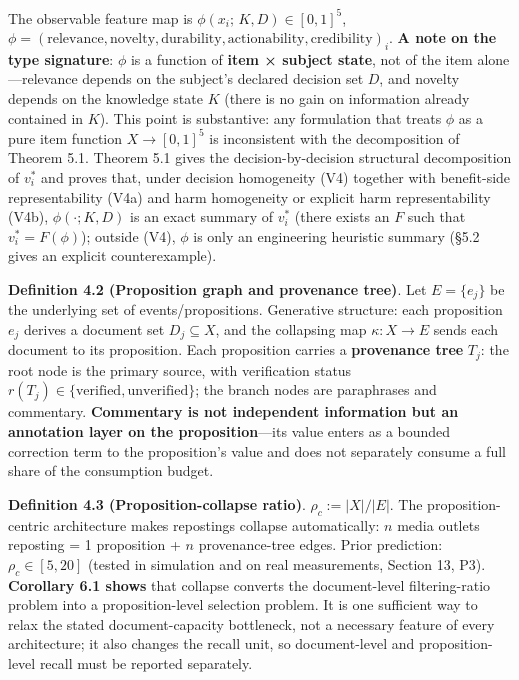 \documentclass[
  11pt]{article}
\begin{document}
The observable feature map is \(\phi(x_i;\, K, D) \in [0,1]^5\),
\(\phi = (\text{relevance}, \text{novelty}, \text{durability}, \text{actionability}, \text{credibility})_i\).
\textbf{A note on the type signature}: \(\phi\) is a function of
\textbf{item × subject state}, not of the item alone---relevance depends
on the subject's declared decision set \(D\), and novelty depends on the
knowledge state \(K\) (there is no gain on information already contained
in \(K\)). This point is substantive: any formulation that treats
\(\phi\) as a pure item function \(X \to [0,1]^5\) is inconsistent with
the decomposition of Theorem 5.1. Theorem 5.1 gives the
decision-by-decision structural decomposition of \(v_i^*\) and proves
that, under decision homogeneity (V4) together with benefit-side
representability (V4a) and harm homogeneity or explicit harm
representability (V4b), \(\phi(\cdot; K, D)\) is an exact summary of
\(v_i^*\) (there exists an \(F\) such that \(v_i^* = F(\phi)\)); outside
(V4), \(\phi\) is only an engineering heuristic summary (§5.2 gives an
explicit counterexample).

\textbf{Definition 4.2 (Proposition graph and provenance tree)}. Let
\(E = \{e_j\}\) be the underlying set of events/propositions. Generative
structure: each proposition \(e_j\) derives a document set
\(D_j \subseteq X\), and the collapsing map \(\kappa: X \to E\) sends
each document to its proposition. Each proposition carries a
\textbf{provenance tree} \(T_j\): the root node is the primary source,
with verification status
\(r(T_j) \in \{\mathrm{verified}, \mathrm{unverified}\}\); the branch
nodes are paraphrases and commentary. \textbf{Commentary is not
independent information but an annotation layer on the
proposition}---its value enters as a bounded correction term to the
proposition's value and does not separately consume a full share of the
consumption budget.

\textbf{Definition 4.3 (Proposition-collapse ratio)}.
\(\rho_c := |X| / |E|\). The proposition-centric architecture makes
repostings collapse automatically: \(n\) media outlets reposting = 1
proposition + \(n\) provenance-tree edges. Prior prediction:
\(\rho_c \in [5, 20]\) (tested in simulation and on real measurements,
Section 13, P3). \textbf{Corollary 6.1 shows} that collapse converts the
document-level filtering-ratio problem into a proposition-level
selection problem. It is one sufficient way to relax the stated
document-capacity bottleneck, not a necessary feature of every
architecture; it also changes the recall unit, so document-level and
proposition-level recall must be reported separately.
\end{document}
